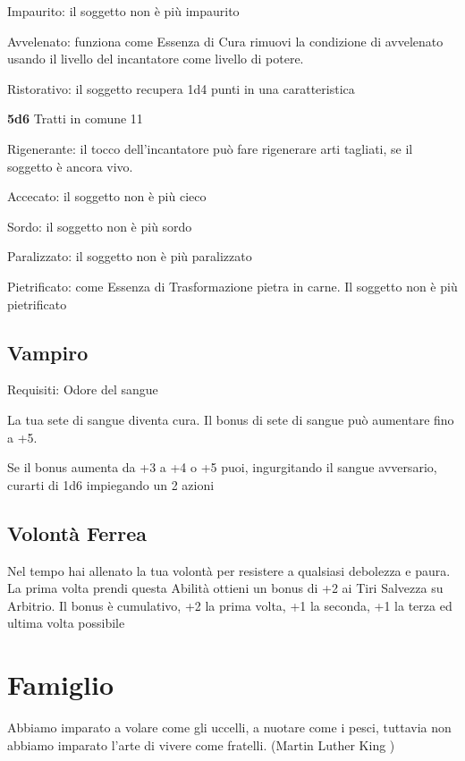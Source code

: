 \documentclass[a4paper,11pt,twoside,openany]{book}
\begin{document}
Impaurito: il soggetto non è più impaurito

Avvelenato: funziona come Essenza di Cura rimuovi la condizione di avvelenato usando il livello del incantatore come livello di potere.

Ristorativo: il soggetto recupera 1d4 punti in una caratteristica

\textbf{5d6} Tratti in comune 11

Rigenerante: il tocco dell'incantatore può fare rigenerare arti tagliati, se il soggetto è ancora vivo.

Accecato: il soggetto non è più cieco

Sordo: il soggetto non è più sordo

Paralizzato: il soggetto non è più paralizzato

Pietrificato: come Essenza di Trasformazione pietra in carne. Il soggetto non è più pietrificato

\subsection{Vampiro}

Requisiti: Odore del sangue

La tua sete di sangue diventa cura. Il bonus di sete di sangue può aumentare fino a +5.

Se il bonus aumenta da +3 a +4 o +5 puoi, ingurgitando il sangue avversario, curarti di 1d6 impiegando un 2 azioni

\subsection{Volontà Ferrea}

Nel tempo hai allenato la tua volontà per resistere a qualsiasi debolezza e paura. La prima volta prendi questa Abilità ottieni un bonus di +2 ai Tiri Salvezza su Arbitrio. Il bonus è cumulativo, +2 la prima volta, +1 la seconda, +1 la terza ed ultima volta possibile

\pagebreak

\section{Famiglio}

\label{famiglio}
\begin{tcolorbox}[enhanced,arc=5pt,boxrule=0.3pt]{
Abbiamo imparato a volare come gli uccelli, a nuotare come i pesci, tuttavia non abbiamo imparato l'arte di vivere come fratelli. (Martin Luther King )}\end{tcolorbox}\medskip
\end{document}
